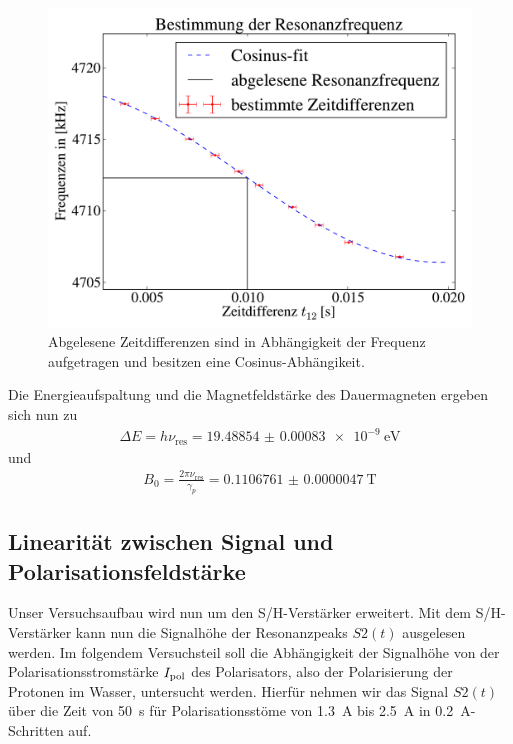 \documentclass[paper=a4,
	fontsize=10pt,
	DIV=18,
	twocolumn,
	parskip=half
	]{scrartcl}
\numberwithin{equation}{section}    %
\begin{document}
\begin{figure}[htp]
	\begin{center}
		\includegraphics[width=\columnwidth]{Data-Plots/02-Resonanzfrequenz.pdf}
		\caption{Abgelesene Zeitdifferenzen sind in Abhängigkeit der Frequenz aufgetragen und besitzen eine Cosinus-Abhängikeit.}
		\label{resonanzfrequenz}
	\end{center}
\end{figure}
Die Energieaufspaltung und die Magnetfeldstärke des Dauermagneten ergeben sich nun zu
\begin{align}
	\Delta E =h\nu_{\mathrm{res}}=\SI[separate-uncertainty=false]{19.48854(83) e-9}{\electronvolt}
\end{align}
und
\begin{align}
	B_0=\frac{2 \pi \nu_{\mathrm{res}}}{\gamma_p}=\SI[separate-uncertainty=false]{0.1106761(47)}{\tesla}
\end{align}



\subsection{Linearität zwischen Signal und Polarisationsfeldstärke}
\label{auswertung4}

Unser Versuchsaufbau wird nun um den S/H-Verstärker erweitert. Mit dem S/H-Verstärker kann nun die Signalhöhe der Resonanzpeaks $S2(t)$ ausgelesen werden. Im folgendem Versuchsteil soll die Abhängigkeit der Signalhöhe von der Polarisationsstromstärke $I_{\rm pol}$ des Polarisators, also der Polarisierung der Protonen im Wasser, untersucht werden. Hierfür nehmen wir das Signal $S2(t)$ über die Zeit von \SI{50}{\second} für Polarisationsstöme von \SI{1.3}{\ampere} bis \SI{2.5}{\ampere} in \SI{0.2}{\ampere}-Schritten auf.
\end{document}
